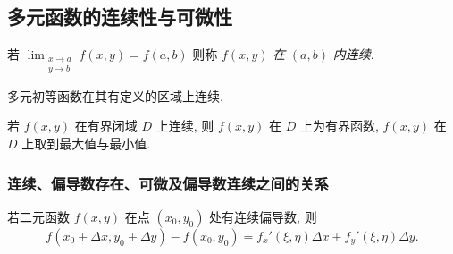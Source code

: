 \subsection{多元函数的连续性与可微性}

\begin{definition}[二元函数连续]
    若 $\displaystyle \lim _{\substack{x \to a \\ y \to b}} f(x, y)=f(a, b)$
    则称 $ f(x, y) $ \textit{在} $ (a, b) $ \textit{内连续}.
\end{definition}

\begin{theorem}
    多元初等函数在其有定义的区域上连续.
\end{theorem}
\begin{theorem}[闭区间多元函数的有界性]
    若 $ f(x, y) $ 在有界闭域 $ D $ 上连续, 则 $ f(x, y) $ 在 $ D $ 上为有界函数, $f(x, y) $ 在 $ D $ 上取到最大值与最小值.
\end{theorem}

\subsubsection{连续、偏导数存在、可微及偏导数连续之间的关系}

\begin{figure}[H]
    \centering
    \caption{}
\end{figure}

\begin{theorem}[连续偏导数]
    若二元函数 $f(x,y)$ 在点 $(x_0,y_0)$ 处有连续偏导数, 则 
    $$
    f(x_0+\Delta x,y_0+\Delta y)-f(x_0,y_0)=f_x'(\xi,\eta)\Delta x+f_y'(\xi, \eta)\Delta y.
    $$
\end{theorem}

